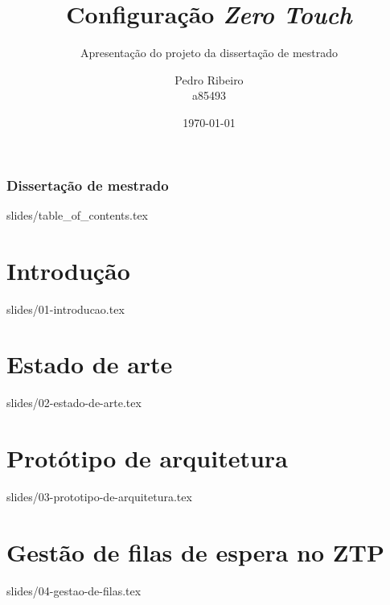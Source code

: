 \documentclass{beamer}
\title{Configuração \textit{Zero Touch}}
\begin{document}
\author[Pedro Ribeiro]{
    \parbox{2.5cm}{%
        \centering Pedro Ribeiro\\a85493
    }%
}


\subtitle{\tiny{Apresentação do projeto da dissertação de mestrado}}


\date{\today}


\begin{frame}
    \frametitle{Dissertação de mestrado}
    \titlepage
\end{frame}

{slides/table_of_contents.tex}

\section{Introdução}
{slides/01-introducao.tex}

\section{Estado de arte}
{slides/02-estado-de-arte.tex}

\section{Protótipo de arquitetura}
{slides/03-prototipo-de-arquitetura.tex}

\section{Gestão de filas de espera no ZTP}
{slides/04-gestao-de-filas.tex}
\end{document}
